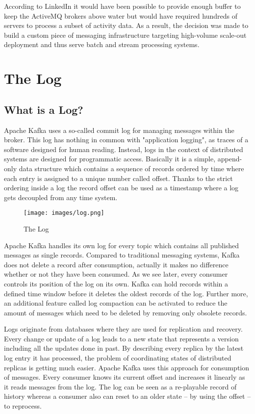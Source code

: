 According to LinkedIn it would have been possible to provide enough buffer to
keep the ActiveMQ brokers above water but would have required hundreds of servers to
process a subset of activity data. As a result, the decision was made to build a
custom piece of messaging infrastructure targeting high-volume scale-out
deployment and thus serve batch and stream processing systems. 
\cite{goodhope2012building}

\section{The Log}
\subsection{What is a Log?}
\label{intro-kafka-log}
Apache Kafka uses a so-called commit log for managing messages within the
broker. This log has nothing in common with "application logging", as traces of
a software designed for human reading. Instead, logs in the context of distributed systems
are designed for programmatic access. Basically it is a simple, append-only data
structure which contains a sequence of records ordered by time where each
entry is assigned to a unique number called offset. Thanks to the strict
ordering inside a log the record offset can be used as a timestamp where a log
gets decoupled from any time system. \cite{apachekafka} \cite{JK-TheLog}

\begin{figure}[H]
    \centering
    \texttt{[image: images/log.png]}
    \caption{The  Log \cite{JK-TheLog}}
    \label{fig:the-log}
\end{figure}

Apache Kafka handles its own log for every topic which contains all
published messages as single records. Compared to traditional messaging systems,
Kafka does not delete a record after consumption, actually it makes no difference
 whether or not they have been consumed. As we see later, every consumer
controls its position of the log on its own. Kafka can hold records within a
defined time window before it deletes the oldest records of the log.
Further more, an additional feature called log compaction can be activated to
reduce the amount of messages which need to be deleted by removing only obsolete
records. \cite{apachekafka} \cite{JK-TheLog}

Logs originate from databases where they are used for replication and
recovery. Every change or update of a log leads to a new state that represents a
version including all the updates done in past. By describing every replica by the
latest log entry it has processed, the problem of coordinating states of
distributed replicas is getting much easier. Apache Kafka uses this approach for
consumption of messages. Every consumer knows its current offset and increases it
linearly as it reads messages from the log. The log can be seen as a re-playable
record of history whereas a consumer also can reset to an older state -- by using
the offset -- to reprocess. \cite{JK-TheLog}

